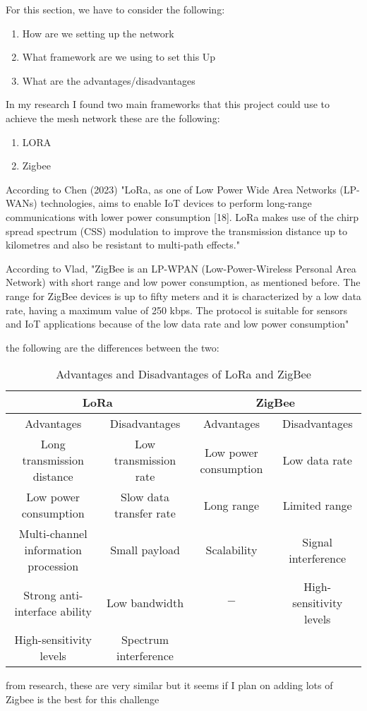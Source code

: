 For this section, we have to consider the following:
	\begin{enumerate}
		\item How are we setting up the network
		\item What framework are we using to set this Up
		\item What are the advantages/disadvantages
	\end{enumerate}
	In my research I found two main frameworks that this project could use to achieve the mesh network these are the following:
	\begin{enumerate}
		\item LORA
		\item Zigbee
	\end{enumerate}
	According to Chen (2023)\cite{chen} "LoRa, as one of Low Power Wide Area Networks (LP-WANs) technologies, aims to enable IoT devices to perform long-range communications with lower power consumption [18]. LoRa makes use of the chirp spread spectrum (CSS) modulation to improve the transmission distance up to kilometres and also be resistant to multi-path effects."
	\par
	According to Vlad\cite{Gavra_Pop_Dobra_2023}, "ZigBee is an LP-WPAN (Low-Power-Wireless Personal Area Network) with short range and low power consumption, as mentioned before. The range for ZigBee devices is up to fifty meters and it is characterized by a low data rate, having a maximum value of 250 kbps. The protocol is suitable for sensors and IoT applications because of the low data rate and low power consumption"
	\par
	the following are the  differences between the two:
	\begin{table}[h]
		\centering
		
		\begin{tabular}{|c|c|c|c|}
		\hline
		\multicolumn{2}{|c|}{LoRa} & \multicolumn{2}{|c|}{ZigBee} \\
		\hline
		Advantages & Disadvantages & Advantages & Disadvantages \\
		\hline
		Long transmission distance & Low transmission rate & Low power consumption & Low data rate \\
		Low power consumption & Slow data transfer rate & Long range & Limited range \\
		Multi-channel information procession & Small payload & Scalability & Signal interference \\
		Strong anti-interface ability & Low bandwidth & $-$ & High-sensitivity levels \\
		High-sensitivity levels & Spectrum interference \\
		\hline
		\end{tabular}
		\caption{Advantages and Disadvantages of LoRa and ZigBee}
		\label{tab:lora_zigbee}
		\end{table}
		from research, these are very  similar  but it seems if I plan on adding lots of Zigbee is the best for this challenge  